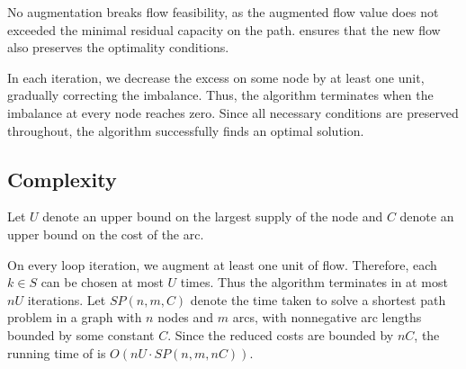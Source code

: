 No augmentation breaks flow feasibility, as the augmented flow value does not exceeded the minimal residual capacity on the path.  ensures that the new flow also preserves the optimality conditions. 

In each iteration, we decrease the excess on some node by at least one unit, gradually correcting the imbalance. Thus, the algorithm terminates when the imbalance at every node reaches zero. Since all necessary conditions are preserved throughout, the algorithm successfully finds an optimal solution.


\subsection{Complexity}

Let $U$ denote an upper bound on the largest supply of the node and $C$ denote an upper bound on the cost of the arc.

On every loop iteration, we augment at least one unit of flow. Therefore, each $k\in S$ can be chosen at most $U$ times. Thus the algorithm terminates in at most $nU$ iterations. Let $SP(n,m,C)$ denote the time taken to solve a shortest path problem in a graph with $n$ nodes and $m$ arcs, with nonnegative arc lengths bounded by some constant $C$. Since the reduced costs are bounded by $nC$, the running time of  is $O(n U\cdot SP(n,m,nC))$.
